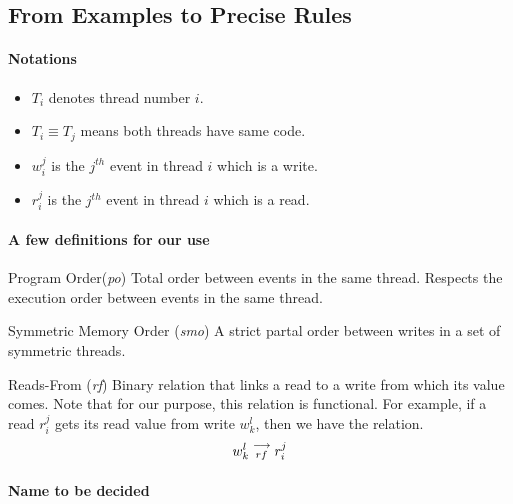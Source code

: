 \subsection{From Examples to Precise Rules}

    \paragraph{Notations}
        \begin{itemize}
            \item $T_i$ denotes thread number $i$.
            \item $T_i \equiv T_j$ means both threads have same code.
            \item $w_i^j$ is the $j^{th}$ event in thread $i$ which is a write.
            \item $r_i^j$ is the $j^{th}$ event in thread $i$ which is a read. 
        \end{itemize}

    
    \paragraph{A few definitions for our use}

    \begin{definition}{Program Order(\emph{po})}
        Total order between events in the same thread. Respects the execution order between events in the same thread. 
    \end{definition}

    \begin{definition}{Symmetric Memory Order (\emph{smo})}
        A strict partal order between writes in a set of symmetric threads.
    \end{definition}


    \begin{definition}{Reads-From (\emph{rf})}
        Binary relation that links a read to a write from which its value comes. Note that for our purpose, this relation is functional.
        For example, if a read $r_i^j$ gets its read value from write $w_k^l$, then we have the relation. 
        \begin{align*}
            w_k^l\stackrel{\longrightarrow}{_{rf}}r_i^j
        \end{align*}
    \end{definition}

    \paragraph{Name to be decided}

